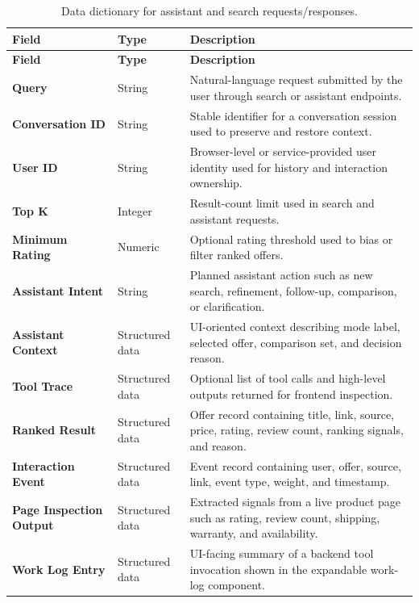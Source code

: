\documentclass[12pt,a4paper,oneside]{report}
\begin{document}
\begingroup
\small
\setlength{\tabcolsep}{4pt}
\renewcommand{\arraystretch}{1.08}
\begin{longtable}{|L{0.22\textwidth}|L{0.14\textwidth}|L{0.47\textwidth}|}
\caption{Data dictionary for assistant and search requests/responses.}\label{tab:api-dictionary}\\
\hline
\textbf{Field} & \textbf{Type} & \textbf{Description} \\
\hline
\endfirsthead
\hline
\textbf{Field} & \textbf{Type} & \textbf{Description} \\
\hline
\endhead
\textbf{Query} & String & Natural-language request submitted by the user through search or assistant endpoints. \\
\hline
\textbf{Conversation ID} & String & Stable identifier for a conversation session used to preserve and restore context. \\
\hline
\textbf{User ID} & String & Browser-level or service-provided user identity used for history and interaction ownership. \\
\hline
\textbf{Top K} & Integer & Result-count limit used in search and assistant requests. \\
\hline
\textbf{Minimum Rating} & Numeric & Optional rating threshold used to bias or filter ranked offers. \\
\hline
\textbf{Assistant Intent} & String & Planned assistant action such as new search, refinement, follow-up, comparison, or clarification. \\
\hline
\textbf{Assistant Context} & Structured data & UI-oriented context describing mode label, selected offer, comparison set, and decision reason. \\
\hline
\textbf{Tool Trace} & Structured data & Optional list of tool calls and high-level outputs returned for frontend inspection. \\
\hline
\textbf{Ranked Result} & Structured data & Offer record containing title, link, source, price, rating, review count, ranking signals, and reason. \\
\hline
\textbf{Interaction Event} & Structured data & Event record containing user, offer, source, link, event type, weight, and timestamp. \\
\hline
\textbf{Page Inspection Output} & Structured data & Extracted signals from a live product page such as rating, review count, shipping, warranty, and availability. \\
\hline
\textbf{Work Log Entry} & Structured data & UI-facing summary of a backend tool invocation shown in the expandable work-log component. \\
\hline
\end{longtable}
\endgroup
\end{document}
